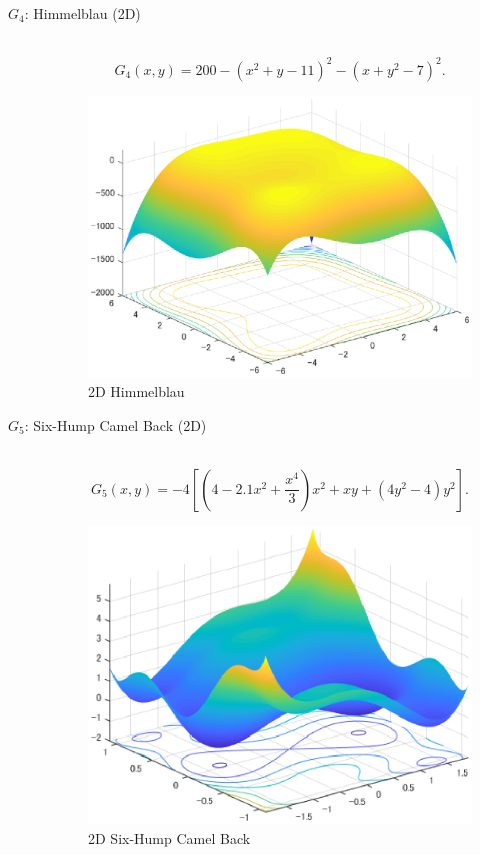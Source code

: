 \documentclass[a4j,11pt]{jarticle}
\begin{document}
\begin{description}
\item[$G_4$: Himmelblau (2D)]\mbox{}\\
\begin{equation}
\label{eq:maxF4}
G_4(x,y) = 200 - (x^2+y-11)^2 - (x+y^2-7)^2.
\end{equation}
\begin{figure}[h]
\centering
\includegraphics[width=0.8\linewidth]{eps/F4.eps}
\caption{2D Himmelblau}
\label{fig:maxF4}
\end{figure}

\item[$G_5$: Six-Hump Camel Back (2D)]\mbox{}\\
\begin{equation}
\label{eq:maxF5}
G_5(x,y)=-4[(4-2.1x^2+\frac{x^4}{3})x^2+xy+(4y^2-4)y^2].
\end{equation}
\begin{figure}[h]
\centering
\includegraphics[width=0.8\linewidth]{eps/F5.eps}
\caption{2D Six-Hump Camel Back}
\label{fig:maxF5}
\end{figure}


\end{description}
\end{document}
